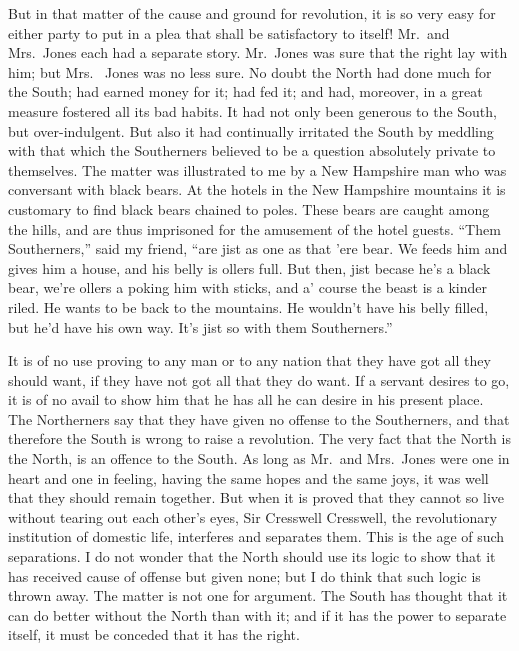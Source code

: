 But in that matter of the cause and ground for revolution, it is so
very easy for either party to put in a plea that shall be
satisfactory to itself!  Mr.\ and Mrs.\ Jones each had a separate
story.  Mr.\ Jones was sure that the right lay with him; but Mrs.\ %
Jones was no less sure.  No doubt the North had done much for the
South; had earned money for it; had fed it; and had, moreover, in a
great measure fostered all its bad habits.  It had not only been
generous to the South, but over-indulgent.  But also it had
continually irritated the South by meddling with that which the
Southerners believed to be a question absolutely private to
themselves.  The matter was illustrated to me by a New Hampshire
man who was conversant with black bears.  At the hotels in the New
Hampshire mountains it is customary to find black bears chained to
poles.  These bears are caught among the hills, and are thus
imprisoned for the amusement of the hotel guests.  ``Them
Southerners,'' said my friend, ``are jist as one as that 'ere bear.
We feeds him and gives him a house, and his belly is ollers full.
But then, jist becase he's a black bear, we're ollers a poking him
with sticks, and a' course the beast is a kinder riled.  He wants
to be back to the mountains.  He wouldn't have his belly filled,
but he'd have his own way.  It's jist so with them Southerners.''

It is of no use proving to any man or to any nation that they have
got all they should want, if they have not got all that they do
want.  If a servant desires to go, it is of no avail to show him
that he has all he can desire in his present place.  The
Northerners say that they have given no offense to the Southerners,
and that therefore the South is wrong to raise a revolution.  The
very fact that the North is the North, is an offence to the South.
As long as Mr.\ and Mrs.\ Jones were one in heart and one in feeling,
having the same hopes and the same joys, it was well that they
should remain together.  But when it is proved that they cannot so
live without tearing out each other's eyes, Sir Cresswell
Cresswell, the revolutionary institution of domestic life,
interferes and separates them.  This is the age of such
separations.  I do not wonder that the North should use its logic
to show that it has received cause of offense but given none; but I
do think that such logic is thrown away.  The matter is not one for
argument.  The South has thought that it can do better without the
North than with it; and if it has the power to separate itself, it
must be conceded that it has the right.

